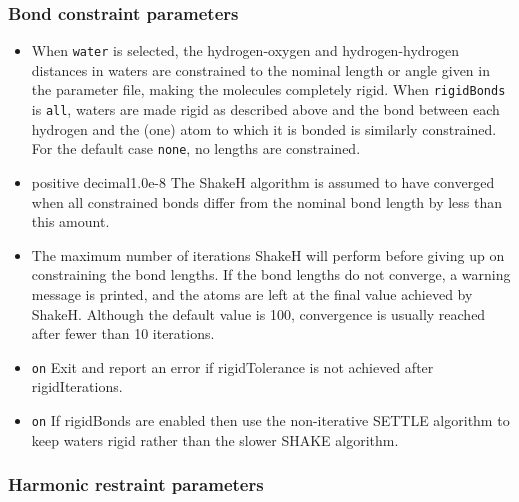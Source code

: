 \subsubsection{Bond constraint parameters}
\label{section:rigidBonds}
\begin{itemize}
\item
{} 
{When {\tt water} is selected, the hydrogen-oxygen and hydrogen-hydrogen
distances in waters are constrained to the nominal length or angle given
in the parameter file, making the molecules completely rigid.
When {\tt rigidBonds} is {\tt all}, waters are made rigid as described above
and the bond between each hydrogen and the (one) atom to which
it is bonded is similarly constrained.
For the default case {\tt none}, no lengths are constrained.
}

\item
{}
{positive decimal}{1.0e-8}
{
The ShakeH algorithm is assumed to have converged when all constrained
bonds differ from the nominal bond length by less than this amount.
}

\item
{}
{
The maximum number of iterations ShakeH will perform before giving up
on constraining the bond lengths.  If the bond lengths do not
converge, a warning message is printed, and the atoms are left at the
final value achieved by ShakeH.  
Although the default value is 100, 
convergence is usually reached after fewer than 10 iterations.
}

\item
{}
{{\tt on}}
{
Exit and report an error if rigidTolerance is not achieved after rigidIterations.
}

\item
{}
{{\tt on}}
{
If rigidBonds are enabled then use the non-iterative SETTLE algorithm to
keep waters rigid rather than the slower SHAKE algorithm.
}
\end{itemize}

\subsubsection{Harmonic restraint parameters}

